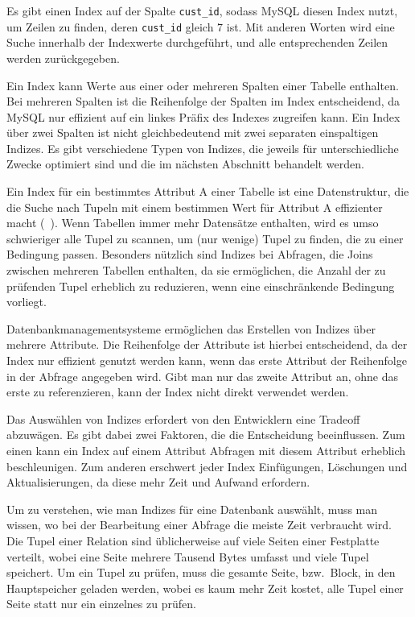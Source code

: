 Es gibt einen Index auf der Spalte \texttt{cust\_id}, sodass MySQL diesen Index nutzt, um Zeilen zu finden, deren \texttt{cust\_id} gleich 7 ist.
Mit anderen Worten wird eine Suche innerhalb der Indexwerte durchgeführt, und alle entsprechenden Zeilen werden zurückgegeben.

Ein Index kann Werte aus einer oder mehreren Spalten einer Tabelle enthalten.
Bei mehreren Spalten ist die Reihenfolge der Spalten im Index entscheidend, da MySQL nur effizient auf ein linkes Präfix des Indexes zugreifen kann.
Ein Index über zwei Spalten ist nicht gleichbedeutend mit zwei separaten einspaltigen Indizes.
Es gibt verschiedene Typen von Indizes, die jeweils für unterschiedliche Zwecke optimiert sind und die im nächsten Abschnitt behandelt werden.

Ein Index für ein bestimmtes Attribut A einer Tabelle ist eine Datenstruktur, die die Suche nach Tupeln mit einem bestimmen Wert für Attribut A effizienter macht (~\cite[pp. 350--353]{garcia2008database}).
Wenn Tabellen immer mehr Datensätze enthalten, wird es umso schwieriger alle Tupel zu scannen, um (nur wenige) Tupel zu finden, die zu einer Bedingung passen.
Besonders nützlich sind Indizes bei Abfragen, die Joins zwischen mehreren Tabellen enthalten, da sie ermöglichen, die Anzahl der zu prüfenden Tupel erheblich zu reduzieren, wenn eine einschränkende Bedingung vorliegt.

Datenbankmanagementsysteme ermöglichen das Erstellen von Indizes über mehrere Attribute.
Die Reihenfolge der Attribute ist hierbei entscheidend, da der Index nur effizient genutzt werden kann, wenn das erste Attribut der Reihenfolge in der Abfrage angegeben wird.
Gibt man nur das zweite Attribut an, ohne das erste zu referenzieren, kann der Index nicht direkt verwendet werden.

Das Auswählen von Indizes erfordert von den Entwicklern eine Tradeoff abzuwägen.
Es gibt dabei zwei Faktoren, die die Entscheidung beeinflussen.
Zum einen kann ein Index auf einem Attribut Abfragen mit diesem Attribut erheblich beschleunigen.
Zum anderen erschwert jeder Index Einfügungen, Löschungen und Aktualisierungen, da diese mehr Zeit und Aufwand erfordern.

Um zu verstehen, wie man Indizes für eine Datenbank auswählt, muss man wissen, wo bei der Bearbeitung einer Abfrage die meiste Zeit verbraucht wird.
Die Tupel einer Relation sind üblicherweise auf viele Seiten einer Festplatte verteilt, wobei eine Seite mehrere Tausend Bytes umfasst und viele Tupel speichert.
Um ein Tupel zu prüfen, muss die gesamte Seite, bzw.\ Block, in den Hauptspeicher geladen werden, wobei es kaum mehr Zeit kostet, alle Tupel einer Seite statt nur ein einzelnes zu prüfen.

